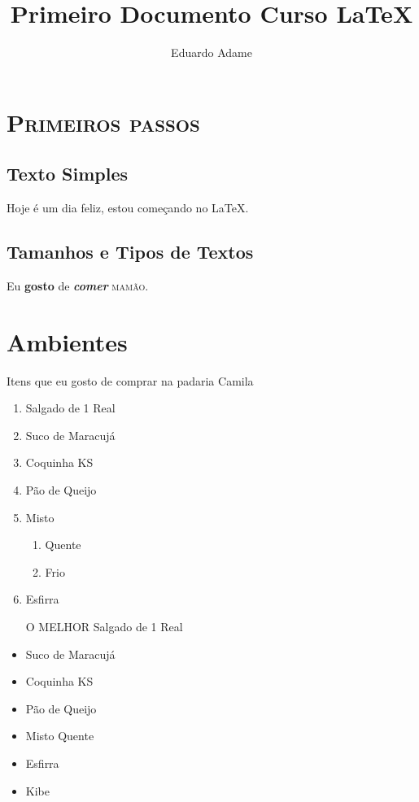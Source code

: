 \documentclass[11pt,a4paper]{article}
\author{Eduardo Adame}
\title{Primeiro Documento Curso \LaTeX}
\begin{document}
\maketitle
\newpage
\tableofcontents
\newpage
\section{\textsc{Primeiros passos}}

\subsection{Texto Simples}
\label{ss:ts}
Hoje é um dia feliz, estou começando no \LaTeX .\\


\subsection{Tamanhos e Tipos de Textos}

{\Large Eu \textbf{gosto} de} \textbf{\textit{comer}} \textsc{mamão}.

\section{Ambientes}
Itens que eu gosto de comprar na padaria Camila
\begin{enumerate}
\item Salgado de 1 Real
\item Suco de Maracujá
\item Coquinha KS
\item Pão de Queijo
\item Misto 
\begin{enumerate}
\item Quente
\item Frio
\end{enumerate}
\item Esfirra 
\end{enumerate}

\begin{itemize}
\item[O MELHOR] Salgado de 1 Real
\item Suco de Maracujá
\item Coquinha KS
\item Pão de Queijo
\item Misto Quente
\item Esfirra
\item Kibe 
\end{itemize}
\end{document}
